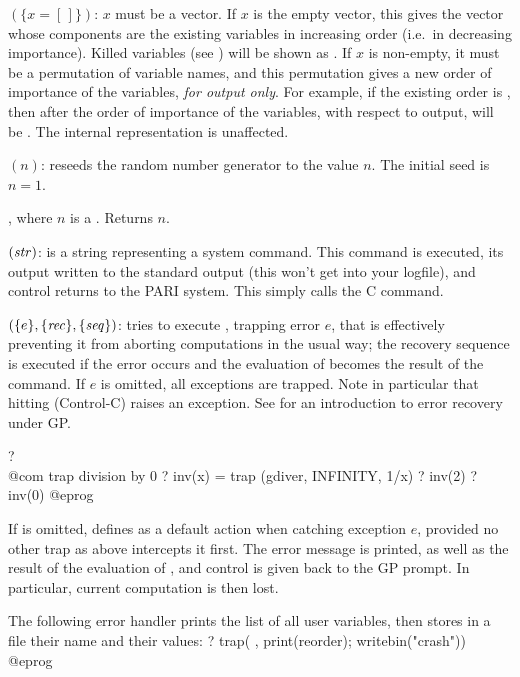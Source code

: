 $(\{x=[\,]\})$: $x$ must be a vector. If $x$ is the
empty vector, this gives the vector whose components are the existing
variables in increasing order (i.e.~in decreasing importance). Killed
variables (see ) will be shown as . If $x$ is
non-empty, it must be a permutation of variable names, and this permutation
gives a new order of importance of the variables, \emph{for output only}. For
example, if the existing order is \kbd{[x,y,z]}, then after
 the order of importance of the variables, with respect
to output, will be \kbd{[z,y,x]}. The internal representation is unaffected.
\label{se:reorder}

$(n)$: reseeds the random number generator to the value
$n$. The initial seed is $n=1$.

, where $n$ is a . Returns $n$.

$(\hbox{\it str\/})$:  is a string representing
a system command. This command is executed, its output written to the
standard output (this won't get into your logfile), and control returns
to the PARI system. This simply calls the C  command.

$(\{e\}, \{\hbox{\it rec\/}\}, \{\hbox{\it seq\/}\})$: tries to
execute , trapping error $e$, that is effectively preventing it
from aborting computations in the usual way; the recovery sequence
 is executed if the error occurs and the evaluation of 
becomes the result of the command. If $e$ is omitted, all exceptions are
trapped. Note in particular that hitting  (Control-C) raises an
exception. See  for an introduction to error recovery
under GP.

\bprog
? \\@com trap division by 0
? inv(x) = trap (gdiver, INFINITY, 1/x)
? inv(2)
? inv(0)
@eprog

If  is omitted, defines  as a default action when
catching exception $e$, provided no other trap as above intercepts it first.
The error message is printed, as well as the result of the evaluation of
, and control is given back to the GP prompt. In particular, current
computation is then lost.

The following error handler prints the list of all user variables, then
stores in a file their name and their values:
\bprog
? { trap( ,
      print(reorder);
      writebin("crash")) }
@eprog

